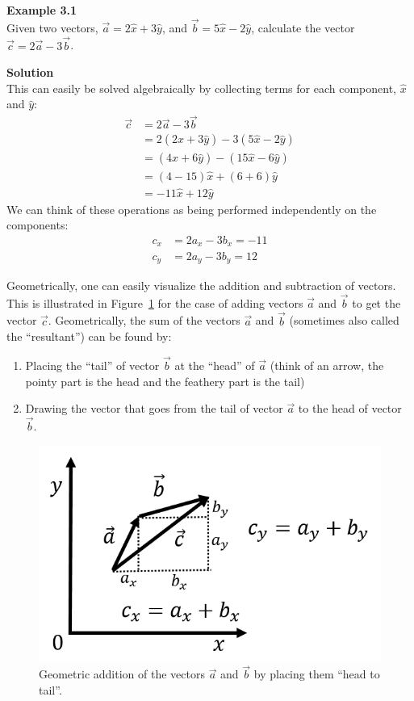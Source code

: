 \begin{framed}
\textbf{Example 3.1}\\
Given two vectors, $\vec a=2\hat x+3\hat y$, and $\vec b=5\hat x -2\hat y$, calculate the vector $\vec c= 2\vec a - 3\vec b$.

\begin{framed}
\textbf{Solution}\\
This can easily be solved algebraically by collecting terms for each component, $\hat x$ and $\hat y$:
\begin{align*}
\vec c &= 2\vec a- 3\vec b\\
&=2 (2\hat x+3\hat y) - 3 (5\hat x-2\hat y) \\
&=(4\hat x+6\hat y)-(15\hat x-6\hat y) \\
&=(4-15)\hat x + (6+6) \hat y\\
&= -11 \hat x + 12 \hat y
\end{align*}
We can think of these operations as being performed independently on the components:
\begin{align*}
c_x&=2a_x-3b_x=-11\\
c_y&=2a_y-3b_y=12
\end{align*}
\end{framed}
\end{framed}

Geometrically, one can easily visualize the addition and subtraction of vectors. This is illustrated in Figure~\ref{fig:Vectors:aplusbvec} for the case of adding vectors $\vec a$ and $\vec b$ to get the vector $\vec c$. Geometrically, the sum of the vectors $\vec a$ and $\vec b$ (sometimes also called the ``resultant'') can be found by:

\begin{enumerate}
\item Placing the ``tail'' of vector $\vec b$ at the ``head'' of $\vec a$ (think of an arrow, the pointy part is the head and the feathery part is the tail)
\item Drawing the vector that goes from the tail of vector $\vec a$ to the head of vector $\vec b$.
\end{enumerate}

\begin{figure}[!htbp]
\centering
\includegraphics[width=0.625\linewidth]{files/aplusbvec-61cf3b3366ea729ed569bbf242b101f4.png}
\caption[]{Geometric addition of the vectors $\vec a$ and $\vec b$ by placing them ``head to tail''.}
\label{fig:Vectors:aplusbvec}
\end{figure}

